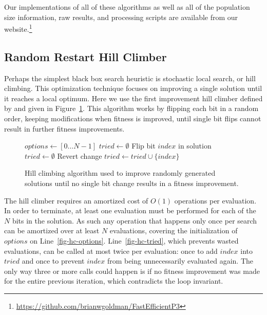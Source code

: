 \documentclass[twoside]{article}
\begin{document}
Our implementations of all of these algorithms as well as all of the population size information, raw results,
and processing scripts
are available from our website.\footnote{\url{https://github.com/brianwgoldman/FastEfficientP3}}
\subsection{Random Restart Hill Climber}
\label{sec-hill-climber}
Perhaps the simplest black box search heuristic is stochastic local search, or hill climbing.
This optimization technique focuses on improving a single solution until it reaches a local
optimum. Here we use the first improvement hill climber defined by \cite{goldman:2014:p3}
and given in Figure~\ref{fig-hc}. This algorithm works by flipping each bit in a random
order, keeping modifications when fitness is improved, until single bit flips cannot result in
further fitness improvements.

\begin{figure}
  \begin{algorithmic}[1]
    \State $options \leftarrow [0 \dots N-1]$\label{fig-hc-options}
    \State $tried \leftarrow \emptyset$
        \label{fig-hc-tried}
          \State Flip bit $index$ in solution
            \State $tried \leftarrow \emptyset$
          \Else
            \State Revert change
          \EndIf
          \State $tried \leftarrow tried \cup \{index\}$
        \EndIf
      \EndFor
    \EndWhile
  \EndProcedure
\end{algorithmic}
  \caption{Hill climbing algorithm used to improve randomly generated solutions until no single
           bit change results in a fitness improvement.}
  \label{fig-hc}
\end{figure}

The hill climber requires an amortized cost of $O(1)$ operations per evaluation. In order to
terminate, at least one evaluation must be performed for each of the $N$ bits in the solution.
As such any operation that happens only once per search can be amortized over at least $N$
evaluations, covering the initialization of $options$ on Line~\ref{fig-hc-options}.
Line~\ref{fig-hc-tried}, which prevents wasted evaluations, can be called at most twice
per evaluation: once to add $index$ into $tried$ and once to prevent $index$ from being unnecessarily
evaluated again. The only way three or more calls could happen is if
no fitness improvement was made for the entire previous iteration, which contradicts the loop invariant.
\end{document}
